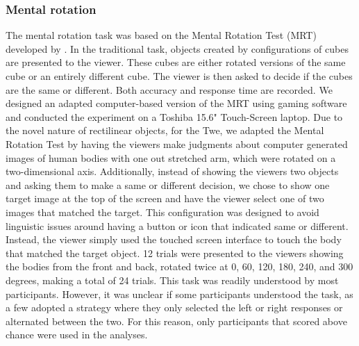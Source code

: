 		\subsubsection{Mental rotation}
		\label{sec:2.2.1}		
The mental rotation task was based on the Mental Rotation Test (MRT) developed by \cite{allport171shepard}. In the traditional task, objects created by configurations of cubes are presented to the viewer. These cubes are either rotated versions of the same cube or an entirely different cube. The viewer is then asked to decide if the cubes are the same or different. Both accuracy and response time are recorded. We designed an adapted computer-based version of the MRT using gaming software \cite{unity14} and conducted the experiment on a Toshiba 15.6" Touch-Screen laptop.  Due to the novel nature of rectilinear objects, for the Twe, we adapted the Mental Rotation Test by having the viewers make judgments about computer generated images of human bodies with one out stretched arm, which were rotated on a two-dimensional axis. Additionally, instead of showing the viewers two objects and asking them to make a same or different decision, we chose to show one target image at the top of the screen and have the viewer select one of two images that matched the target. This configuration was designed to avoid linguistic issues around having a button or icon that indicated same or different. Instead, the viewer simply used the touched screen interface to touch the body that matched the target object. 12 trials were presented to the viewers showing the bodies from the front and back, rotated twice at 0, 60, 120, 180, 240, and 300 degrees, making a total of 24 trials. This task was readily understood by most participants. However, it was unclear if some participants understood the task, as a few adopted a strategy where they only selected the left or right responses or alternated between the two. For this reason, only participants that scored above chance were used in the analyses. 

